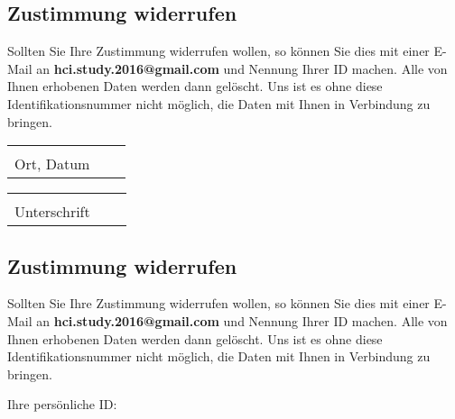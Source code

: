 \documentclass[10pt,a4paper]{scrartcl}
\begin{document}
\subsection*{Zustimmung widerrufen}
Sollten Sie Ihre Zustimmung widerrufen wollen, so können Sie dies mit einer E-Mail an \textbf{hci.study.2016@gmail.com} und Nennung Ihrer ID machen. Alle von Ihnen erhobenen Daten werden dann gelöscht. Uns ist es ohne diese Identifikationsnummer nicht möglich, die Daten mit Ihnen in Verbindung zu bringen.

\vspace{3 cm} 
\begin{tabular}{p{7cm}p{.5cm}l}
	\dotfill \\ 
	Ort, Datum
\end{tabular}
\hfill 
\begin{tabular}{p{7cm}p{.5cm}l}
	\dotfill \\ 
	Unterschrift
\end{tabular}

\newpage

\maketitle

\subsection*{Zustimmung widerrufen}
Sollten Sie Ihre Zustimmung widerrufen wollen, so können Sie dies mit einer E-Mail an \textbf{hci.study.2016@gmail.com} und Nennung Ihrer ID machen. Alle von Ihnen erhobenen Daten werden dann gelöscht. Uns ist es ohne diese Identifikationsnummer nicht möglich, die Daten mit Ihnen in Verbindung zu bringen.

\vspace{2 cm}
\noindent
Ihre persönliche ID: \dotfill\\
\end{document}
